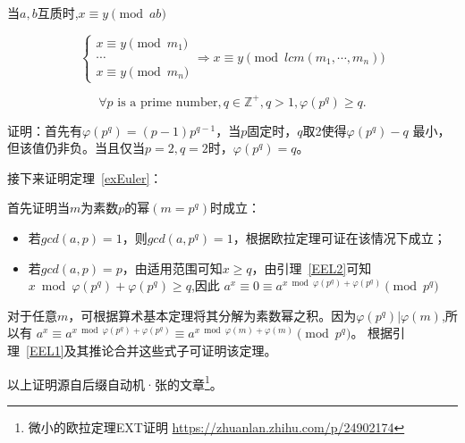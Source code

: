 \begin{inference}\label{EEL1I}
	当$a,b$互质时,$x\equiv y \pmod{ab}$
\end{inference}

\begin{inference}
	\begin{displaymath}
		\left\{
		\begin{array}{l}
			x\equiv y \pmod{m_1} \\
			\cdots               \\
			x\equiv y \pmod{m_n}
		\end{array}
		\right.
		\Rightarrow x\equiv y \pmod{lcm(m_1,\cdots,m_n)}
	\end{displaymath}
\end{inference}

\begin{lemma}\label{EEL2}
	\begin{displaymath}
		\forall p\textrm{ is a prime number},q\in \mathbb{Z^+},q>1,
		\varphi(p^q)\geq q.
	\end{displaymath}
\end{lemma}

证明：首先有$\varphi(p^q)=(p-1)p^{q-1}$，当$p$固定时，$q$取2使得$\varphi(p^q)-q$
最小，但该值仍非负。当且仅当$p=2,q=2$时，$\varphi(p^q)=q$。

接下来证明定理~\ref{exEuler}：

首先证明当$m$为素数$p$的幂$(m=p^q)$时成立：
\begin{itemize}
	\item 若$gcd(a,p)=1$，则$gcd(a,p^q)=1$，根据欧拉定理可证在该情况下成立；
	\item 若$gcd(a,p)=p$，由适用范围可知$x\geq q$，由引理~\ref{EEL2}可知
	      $x \bmod \varphi(p^q) + \varphi(p^q) \geq q$,因此
	      $a^x\equiv 0 \equiv a^{x \bmod \varphi(p^q)+\varphi(p^q)} \pmod{p^q}$
\end{itemize}

对于任意$m$，可根据算术基本定理将其分解为素数幂之积。因为$\varphi(p^q)|\varphi(m)$,所以有
$a^x\equiv a^{x \bmod \varphi(p^q)+\varphi(p^q)}
	\equiv a^{x \bmod \varphi(m)+\varphi(m)} \pmod{p^q}$。
根据引理~\ref{EEL1}及其推论合并这些式子可证明该定理。

以上证明源自后缀自动机·张的文章\footnote{微小的欧拉定理EXT证明
	\url{https://zhuanlan.zhihu.com/p/24902174}}。
